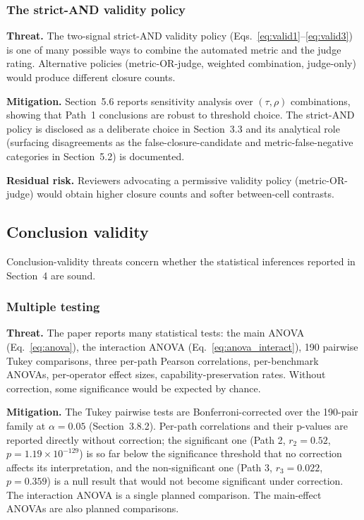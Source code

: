 \subsubsection{The strict-AND validity policy}

\textbf{Threat.} The two-signal strict-AND validity policy (Eqs.~\ref{eq:valid1}--\ref{eq:valid3}) is one of many possible ways to combine the automated metric and the judge rating. Alternative policies (metric-OR-judge, weighted combination, judge-only) would produce different closure counts.

\textbf{Mitigation.} Section~5.6 reports sensitivity analysis over $(\tau, \rho)$ combinations, showing that Path~1 conclusions are robust to threshold choice. The strict-AND policy is disclosed as a deliberate choice in Section~3.3 and its analytical role (surfacing disagreements as the false-closure-candidate and metric-false-negative categories in Section~5.2) is documented.

\textbf{Residual risk.} Reviewers advocating a permissive validity policy (metric-OR-judge) would obtain higher closure counts and softer between-cell contrasts.

\subsection{Conclusion validity}

Conclusion-validity threats concern whether the statistical inferences reported in Section~4 are sound.

\subsubsection{Multiple testing}

\textbf{Threat.} The paper reports many statistical tests: the main ANOVA (Eq.~\ref{eq:anova}), the interaction ANOVA (Eq.~\ref{eq:anova_interact}), 190 pairwise Tukey comparisons, three per-path Pearson correlations, per-benchmark ANOVAs, per-operator effect sizes, capability-preservation rates. Without correction, some significance would be expected by chance.

\textbf{Mitigation.} The Tukey pairwise tests are Bonferroni-corrected over the 190-pair family at $\alpha = 0.05$ (Section~3.8.2). Per-path correlations and their p-values are reported directly without correction; the significant one (Path 2, $r_2 = 0.52$, $p = 1.19 \times 10^{-129}$) is so far below the significance threshold that no correction affects its interpretation, and the non-significant one (Path 3, $r_3 = 0.022$, $p = 0.359$) is a null result that would not become significant under correction. The interaction ANOVA is a single planned comparison. The main-effect ANOVAs are also planned comparisons.


